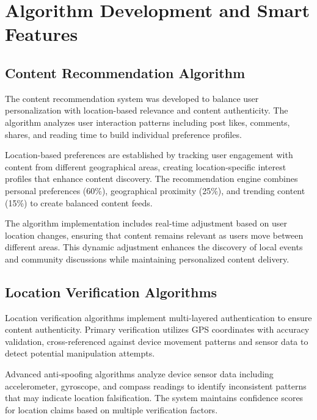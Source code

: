 \section{Algorithm Development and Smart Features}
\label{sec:algorithm-development}

\subsection{Content Recommendation Algorithm}
\label{subsec:recommendation-algorithm}

The content recommendation system was developed to balance user personalization with location-based relevance and content authenticity. The algorithm analyzes user interaction patterns including post likes, comments, shares, and reading time to build individual preference profiles.

Location-based preferences are established by tracking user engagement with content from different geographical areas, creating location-specific interest profiles that enhance content discovery. The recommendation engine combines personal preferences (60\%), geographical proximity (25\%), and trending content (15\%) to create balanced content feeds.

The algorithm implementation includes real-time adjustment based on user location changes, ensuring that content remains relevant as users move between different areas. This dynamic adjustment enhances the discovery of local events and community discussions while maintaining personalized content delivery.

\subsection{Location Verification Algorithms}
\label{subsec:verification-algorithms}

Location verification algorithms implement multi-layered authentication to ensure content authenticity. Primary verification utilizes GPS coordinates with accuracy validation, cross-referenced against device movement patterns and sensor data to detect potential manipulation attempts.

Advanced anti-spoofing algorithms analyze device sensor data including accelerometer, gyroscope, and compass readings to identify inconsistent patterns that may indicate location falsification. The system maintains confidence scores for location claims based on multiple verification factors.

